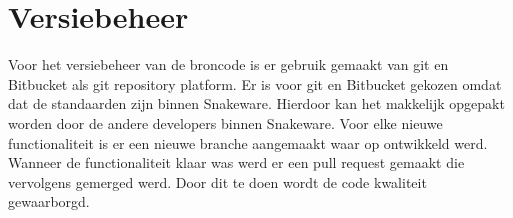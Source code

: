 \section{Versiebeheer}
Voor het versiebeheer van de broncode is er gebruik gemaakt van git en Bitbucket als git repository platform. 
Er is voor git en Bitbucket gekozen omdat dat de standaarden zijn binnen Snakeware.
Hierdoor kan het makkelijk opgepakt worden door de andere developers binnen Snakeware.
Voor elke nieuwe functionaliteit is er een nieuwe branche aangemaakt waar op ontwikkeld werd.
Wanneer de functionaliteit klaar was werd er een pull request gemaakt die vervolgens gemerged werd.
Door dit te doen wordt de code kwaliteit gewaarborgd.
